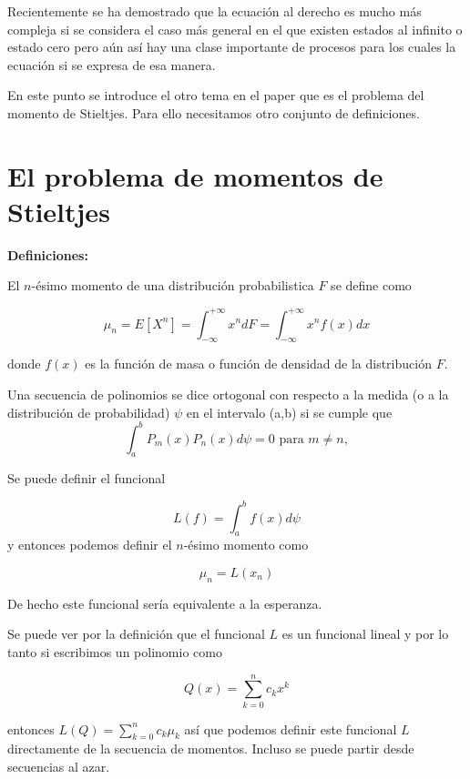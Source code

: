 \documentclass[letter,twoside,12pt]{article}
\numberwithin{equation}{section}
\begin{document}
Recientemente se ha demostrado que la ecuación al derecho es mucho más compleja si se considera el caso más general en el que existen estados al infinito o estado cero pero aún así hay una clase importante de procesos para los cuales la ecuación si se expresa de esa manera.

En este punto se introduce el otro tema en el paper que es el problema del momento de Stieltjes. Para ello necesitamos otro conjunto de definiciones.

\section{El problema de momentos de Stieltjes}

\textbf{Definiciones:}

El $n$-ésimo momento de una distribución probabilistica $F$ se define como

\begin{equation}
\mu_n = E[X^n] = \int_{-\infty}^{+\infty} x^ndF = \int_{-\infty}^{+\infty} x^nf(x)dx 
\end{equation}

donde $f(x) $ es la función de masa o función de densidad de la distribución $F$. 

Una secuencia de polinomios se dice ortogonal con respecto a la medida (o a la distribución de probabilidad) $ \psi $ en el intervalo (a,b) si se cumple que
\begin{equation}
\int_{a}^b  P_m(x)P_n(x)d\psi = 0 \text{ para } m \not = n, \nonumber
\end{equation}

Se puede definir el funcional

$$ L(f)= \int_{a}^b f(x)d\psi $$ y entonces podemos definir el $n$-ésimo momento como

\begin{equation}
\mu_n = L(x_n)	\nonumber
\end{equation}

De hecho este funcional sería equivalente a la esperanza.

Se puede ver por la definición que el funcional $L$ es un funcional lineal y por lo tanto si escribimos un polinomio como 

\begin{equation}
Q(x) = \sum_{k=0}^n c_kx^k \nonumber
\end{equation}

entonces $ L(Q) = \sum_{k=0}^n c_k\mu_k $ así que podemos definir este funcional $L$ directamente de la secuencia de momentos. Incluso se puede partir desde secuencias al azar.
\end{document}
